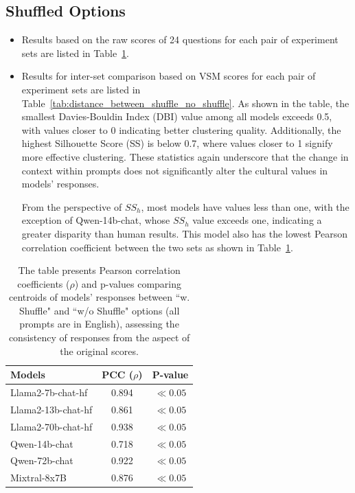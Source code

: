 \documentclass[11pt]{article}
\begin{document}
\subsection{Shuffled Options}
\begin{itemize}
    \item Results based on the raw scores of 24 questions for each pair of experiment sets are listed in Table~\ref{tab:pearson_correlation_shuffle_no_shuffle}.
    \item Results for inter-set comparison based on VSM scores for each pair of experiment sets are listed in Table~\ref{tab:distance_between_shuffle_no_shuffle}. As shown in the table, the smallest Davies-Bouldin Index (DBI) value among all models exceeds 0.5, with values closer to 0 indicating better clustering quality. Additionally, the highest Silhouette Score (SS) is below 0.7, where values closer to 1 signify more effective clustering. These statistics again underscore that the change in context within prompts does not significantly alter the cultural values in models' responses.

    From the perspective of $SS_h$, most models have values less than one, with the exception of Qwen-14b-chat, whose $SS_h$ value exceeds one, indicating a greater disparity than human results. This model also has the lowest Pearson correlation coefficient between the two sets as shown in Table~\ref{tab:pearson_correlation_shuffle_no_shuffle}.
\end{itemize}

\begin{table}
\centering
\setlength\tabcolsep{4pt}
\renewcommand{\arraystretch}{1.25}
\begin{tabular}{l|c|c}
\hline
{{\textbf{Models}}} & {{\textbf{PCC ($\rho$)}}} & {{\textbf{P-value}}} \\
\hline
{Llama2-7b-chat-hf} & 0.894 & $\ll 0.05$ \\
{Llama2-13b-chat-hf} & 0.861 &  $\ll 0.05$ \\
{Llama2-70b-chat-hf} &  0.938 &  $\ll 0.05$ \\
{Qwen-14b-chat} & 0.718 & $\ll 0.05$ \\
{Qwen-72b-chat} & 0.922 & $\ll 0.05$ \\
{Mixtral-8x7B} & 0.876 & $\ll 0.05$ \\
\bottomrule
\end{tabular}
\caption{ The table presents Pearson correlation coefficients ($\rho$) and p-values comparing centroids of models' responses between ``w. Shuffle" and ``w/o Shuffle" options (all prompts are in English), assessing the consistency of responses from the aspect of the original scores. }
\label{tab:pearson_correlation_shuffle_no_shuffle}
\end{table}
\end{document}
